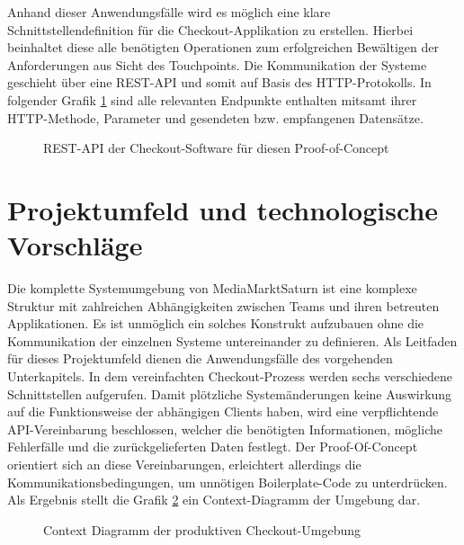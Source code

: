 Anhand dieser Anwendungsfälle wird es möglich eine klare Schnittstellendefinition für die Checkout-Applikation zu erstellen. Hierbei beinhaltet diese alle benötigten Operationen zum erfolgreichen Bewältigen der Anforderungen aus Sicht des Touchpoints. Die Kommunikation der Systeme geschieht über eine \acrshort{REST}-API und somit auf Basis des \acrshort{HTTP}-Protokolls. In folgender Grafik \ref{fig:REST-API} sind alle relevanten Endpunkte enthalten mitsamt ihrer HTTP-Methode, Parameter und gesendeten bzw. empfangenen Datensätze.

\begin{figure}[htbp]
	\centering
	
	\caption{REST-API der Checkout-Software für diesen Proof-of-Concept}
	\label{fig:REST-API}
\end{figure}

\section{Projektumfeld und technologische Vorschläge}

Die komplette Systemumgebung von MediaMarktSaturn ist eine komplexe Struktur mit zahlreichen Abhängigkeiten zwischen Teams und ihren betreuten Applikationen. Es ist unmöglich ein solches Konstrukt aufzubauen ohne die Kommunikation der einzelnen Systeme untereinander zu definieren. Als Leitfaden für dieses Projektumfeld dienen die Anwendungsfälle des vorgehenden Unterkapitels. In dem vereinfachten Checkout-Prozess werden sechs verschiedene Schnittstellen aufgerufen. Damit plötzliche Systemänderungen keine Auswirkung auf die Funktionsweise der abhängigen Clients haben, wird eine verpflichtende API-Vereinbarung beschlossen, welcher die benötigten Informationen, mögliche Fehlerfälle und die zurückgelieferten Daten festlegt. Der Proof-Of-Concept orientiert sich an diese Vereinbarungen, erleichtert allerdings die Kommunikationsbedingungen, um unnötigen \Gls{Boilerplate}-Code zu unterdrücken. Als Ergebnis stellt die Grafik \ref{fig:ContextDiagramm} ein Context-Diagramm der Umgebung dar.


\begin{figure}[htbp]
	\centering
	
	\caption{Context Diagramm der produktiven Checkout-Umgebung}
	\label{fig:ContextDiagramm}
\end{figure}


